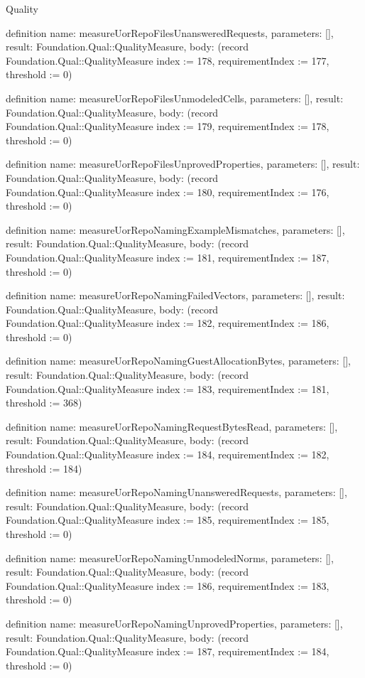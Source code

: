 \begin{lexlean}{Quality}
\begin{semanticmodule}
definition{
  name: measureUorRepoFilesUnansweredRequests,
  parameters: [],
  result: Foundation.Qual::QualityMeasure,
  body: (record Foundation.Qual::QualityMeasure {index := 178, requirementIndex := 177, threshold := 0})
}

definition{
  name: measureUorRepoFilesUnmodeledCells,
  parameters: [],
  result: Foundation.Qual::QualityMeasure,
  body: (record Foundation.Qual::QualityMeasure {index := 179, requirementIndex := 178, threshold := 0})
}

definition{
  name: measureUorRepoFilesUnprovedProperties,
  parameters: [],
  result: Foundation.Qual::QualityMeasure,
  body: (record Foundation.Qual::QualityMeasure {index := 180, requirementIndex := 176, threshold := 0})
}

definition{
  name: measureUorRepoNamingExampleMismatches,
  parameters: [],
  result: Foundation.Qual::QualityMeasure,
  body: (record Foundation.Qual::QualityMeasure {index := 181, requirementIndex := 187, threshold := 0})
}

definition{
  name: measureUorRepoNamingFailedVectors,
  parameters: [],
  result: Foundation.Qual::QualityMeasure,
  body: (record Foundation.Qual::QualityMeasure {index := 182, requirementIndex := 186, threshold := 0})
}

definition{
  name: measureUorRepoNamingGuestAllocationBytes,
  parameters: [],
  result: Foundation.Qual::QualityMeasure,
  body: (record Foundation.Qual::QualityMeasure {index := 183, requirementIndex := 181, threshold := 368})
}

definition{
  name: measureUorRepoNamingRequestBytesRead,
  parameters: [],
  result: Foundation.Qual::QualityMeasure,
  body: (record Foundation.Qual::QualityMeasure {index := 184, requirementIndex := 182, threshold := 184})
}

definition{
  name: measureUorRepoNamingUnansweredRequests,
  parameters: [],
  result: Foundation.Qual::QualityMeasure,
  body: (record Foundation.Qual::QualityMeasure {index := 185, requirementIndex := 185, threshold := 0})
}

definition{
  name: measureUorRepoNamingUnmodeledNorms,
  parameters: [],
  result: Foundation.Qual::QualityMeasure,
  body: (record Foundation.Qual::QualityMeasure {index := 186, requirementIndex := 183, threshold := 0})
}

definition{
  name: measureUorRepoNamingUnprovedProperties,
  parameters: [],
  result: Foundation.Qual::QualityMeasure,
  body: (record Foundation.Qual::QualityMeasure {index := 187, requirementIndex := 184, threshold := 0})
}


\end{semanticmodule}
\end{lexlean}
